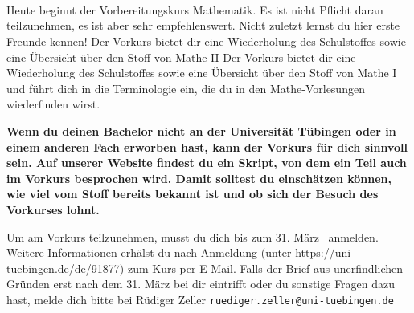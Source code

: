 \begin{description}
\ifml
	\item~ %
\else
    \ifkogwiss
        \ifmaster
            \item~
        \fi
    \else
      \item[Montag, 06. April \YEAR]\ \\
      Heute beginnt der Vorbereitungskurs Mathematik. Es ist nicht Pflicht daran teilzunehmen,
	es ist aber sehr empfehlenswert.
	Nicht zuletzt lernst du hier erste Freunde kennen!
	\ifsommersemester
	Der Vorkurs bietet dir eine Wiederholung des Schulstoffes sowie eine Übersicht über den Stoff von Mathe II
	\fi
	\ifwintersemester
	Der Vorkurs bietet dir eine Wiederholung des Schulstoffes sowie eine Übersicht über den Stoff von Mathe I
	\fi
	und führt dich in die Terminologie ein, die du in den Mathe-Vorlesungen wiederfinden wirst.
	
	\ifmaster
	\textbf{Wenn du deinen Bachelor nicht an der Universität Tübingen oder in einem anderen Fach erworben hast, kann der Vorkurs für dich sinnvoll sein. Auf unserer Website findest du ein Skript, von dem ein Teil auch im Vorkurs besprochen wird. Damit solltest du einschätzen können, wie viel vom Stoff bereits bekannt ist und ob sich der Besuch des Vorkurses lohnt.}
	\fi
	
		Um am Vorkurs teilzunehmen, musst du dich bis zum 31. März \YEAR~anmelden. Weitere Informationen erhälst du nach Anmeldung (unter \url{https://uni-tuebingen.de/de/91877}) zum Kurs per E-Mail. Falls der Brief aus unerfindlichen Gründen erst nach dem 31. März bei dir eintrifft oder du sonstige Fragen dazu hast, melde dich bitte bei Rüdiger Zeller \texttt{ruediger.zeller@uni-tuebingen.de}\\

	\ifsommersemester
	\fi


\end{description}
